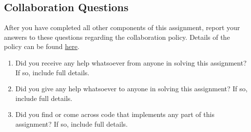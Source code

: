 \documentclass[11pt,addpoints,answers]{exam}
\begin{document}
\begin{questions}
\newpage
\newpage
\section{Collaboration Questions}
After you have completed all other components of this assignment, report your answers to these questions regarding the collaboration policy. Details of the policy can be found \href{http://www.cs.cmu.edu/~mgormley/courses/10601/syllabus.html}{here}.
\begin{enumerate}
    \item Did you receive any help whatsoever from anyone in solving this assignment? If so, include full details.
    \item Did you give any help whatsoever to anyone in solving this assignment? If so, include full details.
    \item Did you find or come across code that implements any part of this assignment? If so, include full details.
\end{enumerate}

\begin{your_solution}[height=6cm]

\end{your_solution}
\end{questions}
\end{document}
